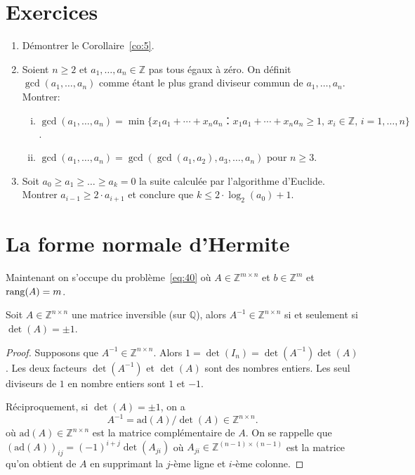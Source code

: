 \section*{Exercices}


\begin{enumerate}
\item Démontrer le Corollaire~\ref{co:5}.
\item Soient $n≥2$ et $a_1,\dots,a_n∈ ℤ$ pas tous égaux à zéro. On définit $\gcd(a_1,\dots,a_n)$ comme étant le plus grand diviseur commun de $a_1,\dots,a_n$. Montrer: 
  \begin{enumerate}[i)]
    \item  $\gcd(a_1,\dots,a_n) =  \min\{x_1a_1+ \cdots + x_n a_n ： x_1a_1+ \cdots + x_n a_n≥1, \, x_i ∈ℤ, \, i=1,\dots,n\}$. 
  \item $\gcd(a_1,\dots,a_n) = \gcd(\gcd(a_1,a_2), a_3, \dots, a_n)$ pour $n≥3$. 
  \end{enumerate}
\item Soit $a_0≥a_1≥\dots≥a_k=0$ la suite calculée par l'algorithme d'Euclide. Montrer $a_{i-1} ≥ 2⋅ a_{i+1}$ et conclure  que $k ≤2 ⋅ \log_2(a_0)+1$.  
\end{enumerate}



\section{La forme normale d'Hermite}
\label{sec:la-forme-normale-1}

Maintenant on s'occupe du problème~\eqref{eq:40} où $A ∈ ℤ^{m ×n}$ et $b ∈ℤ^m$ et $\operatorname{rang}(A) = m$.

\begin{lemma}
  \label{lem:23}
  Soit $A ∈ℤ^{n ×n}$ une matrice inversible (sur $ℚ$), alors $A^{-1} ∈ ℤ^{n ×n}$ si et seulement si $\det(A) = \pm 1$. 
\end{lemma}

\begin{proof}
  Supposons que $A^{-1} ∈ℤ^{n ×n}$. Alors $1 = \det(I_n)  = \det(A^{-1}) \det(A)$. Les deux facteurs $\det(A^{-1})$ et $ \det(A)$ sont des nombres entiers. Les seul diviseurs de $1$ en nombre entiers sont $1$ et $-1$.

  Réciproquement, si $\det(A) = \pm 1$, on a
  \begin{displaymath}
    A^{-1} = \mathrm{ad}(A) / \det(A) ∈ℤ^{n ×n}. 
  \end{displaymath}
  où $\mathrm{ad}(A) ∈ ℤ^{n ×n}$ est la matrice complémentaire de $A$. On se rappelle que $(\mathrm{ad}(A))_{ij} = (-1)^{i+j}\det(A_{ji})$ où $A_{ji}∈ℤ^{(n-1)×(n-1)}$ est la matrice qu'on obtient de $A$ en supprimant la $j$-ème ligne et $i$-ème colonne.
  \end{proof}

